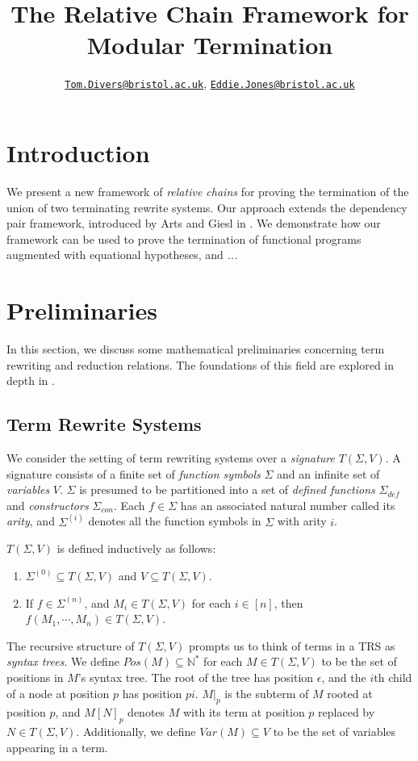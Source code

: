 \documentclass{article}
\title{The Relative Chain Framework for Modular Termination}
\author{\href{mailto:oi24939@bristol.ac.uk}{\texttt{Tom.Divers@bristol.ac.uk}}, \href{mailto:eddie.jones@bristol.ac.uk}{\texttt{Eddie.Jones@bristol.ac.uk}}}
\date{}
\begin{document}
\maketitle

\section{Introduction}

We present a new framework of \emph{relative chains} for proving the termination of the union of two terminating rewrite systems. Our approach extends the dependency pair framework, introduced by Arts and Giesl in \cite{arts2000dependency}. We demonstrate how our framework can be used to prove the termination of functional programs augmented with equational hypotheses, and \emph{...}

\section{Preliminaries}

In this section, we discuss some mathematical preliminaries concerning term rewriting and reduction relations. The foundations of this field are explored in depth in \cite{baader1998terms}.

\subsection{Term Rewrite Systems}

We consider the setting of term rewriting systems over a \emph{signature} $T(\Sigma, V)$. A signature consists of a finite set of \emph{function symbols} $\Sigma$ and an infinite set of \emph{variables} $V$. $\Sigma$ is presumed to be partitioned into a set of \emph{defined functions} $\Sigma_{def}$ and \emph{constructors} $\Sigma_{con}$. Each $f \in \Sigma$ has an associated natural number called its \emph{arity}, and $\Sigma^{(i)}$ denotes all the function symbols in $\Sigma$ with arity $i$.

$T(\Sigma, V)$ is defined inductively as follows: \begin{enumerate}
    \item $\Sigma^{(0)} \subseteq T(\Sigma, V)$ and $V \subseteq T(\Sigma, V)$. 
    \item If $f \in \Sigma^{(n)}$, and $M_i \in T(\Sigma, V)$ for each $i \in [n]$, then $f(M_1, \cdots, M_n) \in T(\Sigma, V)$. 
\end{enumerate}

The recursive structure of $T(\Sigma, V)$ prompts us to think of terms in a TRS as \emph{syntax trees}. We define $Pos(M) \subseteq \mathbb{N}^*$ for each $M \in T(\Sigma, V)$ to be the set of positions in $M$'s syntax tree. The root of the tree has position $\epsilon$, and the $i$th child of a node at position $p$ has position $pi$. $M|_p$ is the subterm of $M$ rooted at position $p$, and $M[N]_p$ denotes $M$ with its term at position $p$ replaced by $N \in T(\Sigma, V)$. Additionally, we define $Var(M) \subseteq V$ to be the set of variables appearing in a term.
\end{document}
